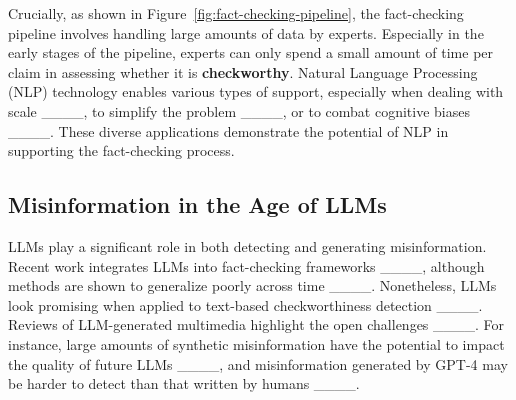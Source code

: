 Crucially, as shown in Figure~\ref{fig:fact-checking-pipeline}, the fact-checking pipeline involves handling large amounts of data by experts. Especially in the early stages of the pipeline, experts can only spend a small amount of time per claim in assessing whether it is \textbf{checkworthy}. Natural Language Processing (NLP) technology enables various types of support, especially when dealing with scale ____, to simplify the problem ____, or to combat cognitive biases ____. These diverse applications demonstrate the potential of NLP in supporting the fact-checking process.


\subsection{Misinformation in the Age of LLMs}
LLMs play a significant role in both detecting and generating misinformation. Recent work integrates LLMs into fact-checking frameworks ____, although methods are shown to generalize poorly across time ____. Nonetheless, LLMs look promising when applied to text-based checkworthiness detection ____. Reviews of LLM-generated multimedia highlight the open challenges ____. For instance, large amounts of synthetic misinformation have the potential to impact the quality of future LLMs ____, and misinformation generated by GPT-4 may be harder to detect than that written by humans ____.

